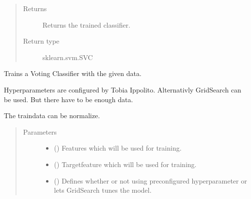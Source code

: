\documentclass[letterpaper,10pt,english]{sphinxmanual}
\begin{document}
\begin{fulllineitems}
\begin{quote}
\begin{description}
\begin{itemize}
\end{itemize}

\item[{Returns}] \leavevmode
\sphinxAtStartPar
Returns the trained classifier.

\item[{Return type}] \leavevmode
\sphinxAtStartPar
sklearn.svm.SVC

\end{description}\end{quote}

\end{fulllineitems}


\begin{fulllineitems}
\label{\detokenize{anoog.model:anoog.model.model.train_voting_classifier}}
\sphinxAtStartPar
Trains a Voting Classifier with the given data.

\sphinxAtStartPar
Hyperparameters are configured by Tobia Ippolito. Alternativly GridSearch can be used. But there have to be enough data.

\sphinxAtStartPar
The traindata can be normalize.
\begin{quote}\begin{description}
\item[{Parameters}] \leavevmode\begin{itemize}
\item {} 
\sphinxAtStartPar
{} () \textendash{} Features which will be used for training.

\item {} 
\sphinxAtStartPar
{} () \textendash{} Target\sphinxhyphen{}feature which will be used for training.

\item {} 
\sphinxAtStartPar
{} (\sphinxstyleliteralemphasis{\sphinxupquote{, }}) \textendash{} Defines whether or not using preconfigured hyperparameter or lets GridSearch tunes the model.


\end{itemize}
\end{description}
\end{quote}
\end{fulllineitems}
\end{document}
